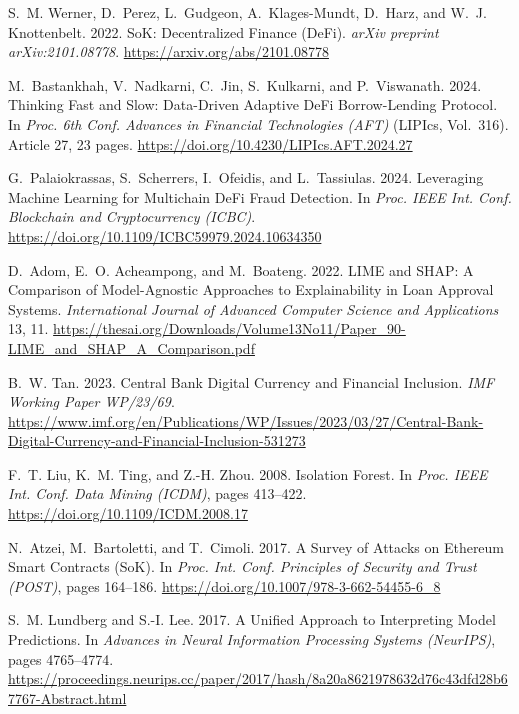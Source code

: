 \documentclass[12pt, a4paper]{report}
\begin{document}
{\small
\begin{enumerate}[label={[\arabic*]}]
\setlength{\itemsep}{4pt}
\setlength{\parsep}{0pt}
\setlength{\parskip}{0pt}
\item S.~M. Werner, D.~Perez, L.~Gudgeon, A.~Klages-Mundt, D.~Harz, and W.~J. Knottenbelt. 2022. SoK: Decentralized Finance (DeFi). \emph{arXiv preprint arXiv:2101.08778}. \url{https://arxiv.org/abs/2101.08778}

\item M.~Bastankhah, V.~Nadkarni, C.~Jin, S.~Kulkarni, and P.~Viswanath. 2024. Thinking Fast and Slow: Data-Driven Adaptive DeFi Borrow-Lending Protocol. In \emph{Proc. 6th Conf. Advances in Financial Technologies (AFT)} (LIPIcs, Vol.~316). Article 27, 23 pages. \url{https://doi.org/10.4230/LIPIcs.AFT.2024.27}

\item G.~Palaiokrassas, S.~Scherrers, I.~Ofeidis, and L.~Tassiulas. 2024. Leveraging Machine Learning for Multichain DeFi Fraud Detection. In \emph{Proc. IEEE Int. Conf. Blockchain and Cryptocurrency (ICBC)}. \url{https://doi.org/10.1109/ICBC59979.2024.10634350}

\item D.~Adom, E.~O. Acheampong, and M.~Boateng. 2022. LIME and SHAP: A Comparison of Model-Agnostic Approaches to Explainability in Loan Approval Systems. \emph{International Journal of Advanced Computer Science and Applications} 13, 11. \url{https://thesai.org/Downloads/Volume13No11/Paper_90-LIME_and_SHAP_A_Comparison.pdf}

\item B.~W. Tan. 2023. Central Bank Digital Currency and Financial Inclusion. \emph{IMF Working Paper WP/23/69}. \url{https://www.imf.org/en/Publications/WP/Issues/2023/03/27/Central-Bank-Digital-Currency-and-Financial-Inclusion-531273}

\item F.~T. Liu, K.~M. Ting, and Z.-H. Zhou. 2008. Isolation Forest. In \emph{Proc. IEEE Int. Conf. Data Mining (ICDM)}, pages 413--422. \url{https://doi.org/10.1109/ICDM.2008.17}

\item N.~Atzei, M.~Bartoletti, and T.~Cimoli. 2017. A Survey of Attacks on Ethereum Smart Contracts (SoK). In \emph{Proc. Int. Conf. Principles of Security and Trust (POST)}, pages 164--186. \url{https://doi.org/10.1007/978-3-662-54455-6_8}

\item S.~M. Lundberg and S.-I. Lee. 2017. A Unified Approach to Interpreting Model Predictions. In \emph{Advances in Neural Information Processing Systems (NeurIPS)}, pages 4765--4774. \url{https://proceedings.neurips.cc/paper/2017/hash/8a20a8621978632d76c43dfd28b67767-Abstract.html}


\end{enumerate}}
\end{document}
